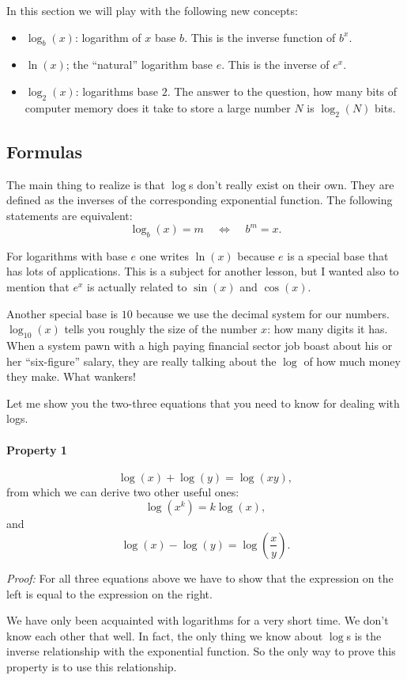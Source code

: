 \documentclass[journal]{IEEEtran}
\newcommand{\dokutitleleveltree}[1]{\subsection{#1}}
\newcommand{\dokutitlelevelfive}[1]{\paragraph{#1}}
\newcommand{\dokuitalic}[1]{\textsl{#1}}
\newcommand{\dokuitem}{\item}
\begin{document}
In this section we will play with the following new concepts:


\begin{itemize}\dokuitem  \(\log_b(x)\): logarithm of \(x\) base \(b\). This is the inverse function of \(b^x\).
\dokuitem  \(\ln(x)\); the ``natural'' logarithm base \(e\). This is the inverse of \(e^x\).
\dokuitem  \(\log_2(x)\): logarithms base \(2\). The answer to the question, how many bits of computer memory does it take to store a large number \(N\)  is \(\log_2(N)\) bits.
\end{itemize}

\dokutitleleveltree{Formulas}
\label{51d24e1edefe34e683025dbba5c6eed6}%

The main thing to realize is that \(\log\)s don't really exist on their own.
They are defined as the inverses of the corresponding exponential function.
The following statements are equivalent:
\[
  \log_b(x)=m \ \ \ \ \  \Leftrightarrow \ \ \ \ \ b^m=x.
\]

For logarithms with base \(e\) one writes \(\ln(x)\) because
\(e\) is a special base that has lots of applications.
This is a subject for another lesson, but I wanted also
to mention that \(e^x\) is actually related to \(\sin(x)\) and \(\cos(x)\).

Another special base is \(10\) because we use the decimal
system for our numbers. \(\log_{10}(x)\) tells you roughly
the size of the number \(x\): how many digits it has. 
When a system pawn with a high paying financial sector job
boast about his or her ``six-figure'' salary, they are really talking
about the \(\log\) of how much money they make.
What wankers! 

Let me show you the two-three equations that you need to know
for dealing with logs.


\dokutitlelevelfive{Property 1}

\[
  \log(x)+\log(y)=\log(xy),
\]
from which we can derive two other useful ones:
\[
  \log(x^k)=k\log(x),
\]
and 
\[ 
  \log(x)-\log(y)=\log\left(\frac{x}{y}\right).
\]

\dokuitalic{Proof:} For all three equations above we have to show
that the expression on the left is equal to the expression
on the right.

We have only been acquainted with logarithms for a very
short time. We don't know each other that well. 
In fact, the only thing we know about \(\log\)s is the 
inverse relationship with the exponential function.
So the only way to prove this property is to use this relationship.
\end{document}
